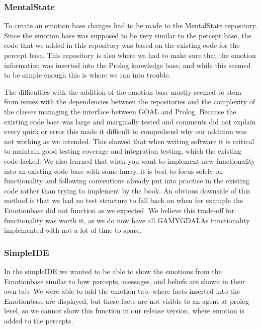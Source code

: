 \documentclass[11pt]{article}
\begin{document}
\subsubsection{MentalState}
To create an emotion base changes had to be made to the MentalState repository. Since the emotion base was supposed to be very similar to the percept base, the code that we added in this repository was based on the existing code for the percept base. This repository is also where we had to make sure that the emotion information was inserted into the Prolog\cite{Prolog} knowledge base, and while this seemed to be simple enough this is where we ran into trouble. \par 
The difficulties with the addition of the emotion base mostly seemed to stem from issues with the dependencies between the repositories and the complexity of the classes managing the interface between GOAL and Prolog. Because the existing code base was large and marginally tested and comments did not explain every quirk or error this made it difficult to comprehend why our addition was not working as we intended. This showed that when writing software it is critical to maintain good testing coverage and integration testing, which the existing code lacked. We also learned that when you want to implement new functionality into an existing code base with some hurry, it is best to focus solely on functionality and following conventions already put into practice in the existing code rather than trying to implement by the book. An obvious downside of this method is that we had no test structure to fall back on when for example the Emotionbase did not function as we expected. We believe this trade-off for functionality was worth it, as we do now have all GAMYGDALAs functionality implemented with not a lot of time to spare.
\subsubsection{SimpleIDE}
In the simpleIDE\cite{SimpleIDE} we wanted to be able to show the emotions from the Emotionbase similar to how percepts, messages, and beliefs are shown in their own tab. We were able to add the emotion tab, where facts inserted into the Emotionbase are displayed, but these facts are not visible to an agent at prolog level, so we cannot show this function in our release version, where emotion is added to the percepts.
\end{document}
